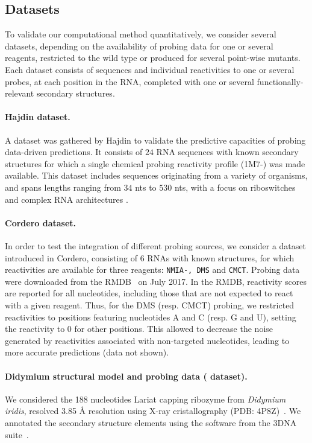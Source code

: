 \documentclass[a4,center,fleqn]{NAR}
\begin{document}
\subsection*{Datasets} 
\label{sec:datasets}
To validate our computational method quantitatively, we consider several datasets, depending on the availability of probing data for one or several reagents, restricted to the wild type or produced for several point-wise mutants. Each dataset consists of sequences and individual reactivities to one or several probes, at each position in the RNA, completed with one or several functionally-relevant secondary structures.

\paragraph{Hajdin dataset.} 
A dataset was gathered by Hajdin\etal\cite{Hajdin2013} to validate the predictive capacities of probing data-driven predictions. It consists of $24$ RNA sequences with known secondary structures for which a single chemical probing reactivity profile (1M7-\SH) was made available.
This dataset includes sequences originating from a variety of organisms, and spans lengths ranging from $34$ nts to $530$ nts, with a focus on riboswitches and complex RNA architectures . 


\paragraph{Cordero dataset.} 
In order to test the integration of different probing sources, we consider a dataset introduced in Cordero\etal\cite{Cordero2012}, consisting of $6$ RNAs with known structures, for which reactivities are available for three reagents: {\tt NMIA-\SH, DMS} and {\tt CMCT}. 
Probing data were downloaded from the RMDB~\citep{Cordero2012a} on July 2017. In the RMDB, reactivity scores are reported for all nucleotides, including those that are not expected to react with a given reagent. Thus, for the DMS (resp. CMCT) probing, we restricted reactivities to positions featuring nucleotides {\sf A} and {\sf C} (resp. {\sf G} and {\sf U}), setting the reactivity to 0 for other positions. This allowed to decrease the noise generated by reactivities associated with non-targeted nucleotides, leading to more accurate predictions (data not shown). 



\paragraph{Didymium structural model and probing data (\didy{} dataset).} 
We considered the 188 nucleotides Lariat capping ribozyme from {\itshape Didymium iridis}, resolved 3.85 \AA{} resolution using X-ray cristallography (PDB: 4P8Z)~\citep{Meyer2014}.  We annotated the secondary structure elements using the  software from the 3DNA suite~\cite{Lu2015}. 
\end{document}
